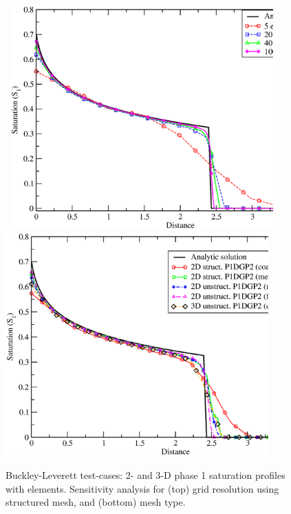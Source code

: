 \begin{figure}[h]
\vbox{\hbox{\hspace{.3cm}
    \includegraphics[width=0.9\textwidth]{BL_2d_P1DGP2_convergence.eps}}
\vspace{-.0cm}\hbox{\hspace{.3cm}
    \includegraphics[width=0.9\textwidth]{simulations_2d_3d.eps}}}
    \caption{Buckley-Leverett test-cases: 2- and 3-D phase 1 saturation profiles with  elements. Sensitivity analysis for (top) grid resolution using structured  mesh, and (bottom) mesh type.\label{fig:BL_2d_profiles}}
\end{figure}




